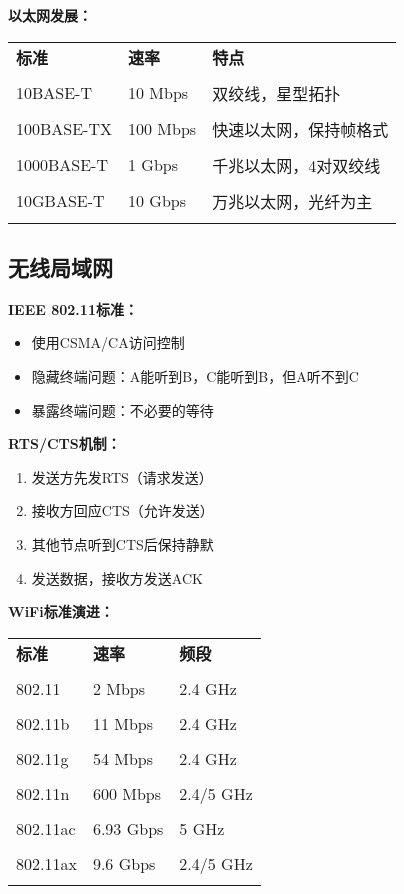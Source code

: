\documentclass[lang=cn,newtx,10pt,scheme=chinese]{../../elegantbook}
\begin{document}
\textbf{以太网发展：}
\begin{longtable}{@{}p{3cm}p{4cm}p{6cm}@{}}
\toprule
\textbf{标准} & \textbf{速率} & \textbf{特点} \\\\ \midrule
\endhead

10BASE-T & 10 Mbps & 双绞线，星型拓扑 \\\\
100BASE-TX & 100 Mbps & 快速以太网，保持帧格式 \\\\
1000BASE-T & 1 Gbps & 千兆以太网，4对双绞线 \\\\
10GBASE-T & 10 Gbps & 万兆以太网，光纤为主 \\\\

\bottomrule
\end{longtable}

\subsection{无线局域网}

\textbf{IEEE 802.11标准：}
\begin{itemize}
  \item 使用CSMA/CA访问控制
  \item 隐藏终端问题：A能听到B，C能听到B，但A听不到C
  \item 暴露终端问题：不必要的等待
\end{itemize}

\textbf{RTS/CTS机制：}
\begin{enumerate}
  \item 发送方先发RTS（请求发送）
  \item 接收方回应CTS（允许发送）
  \item 其他节点听到CTS后保持静默
  \item 发送数据，接收方发送ACK
\end{enumerate}

\textbf{WiFi标准演进：}
\begin{longtable}{@{}p{2.5cm}p{4cm}p{6cm}@{}}
\toprule
\textbf{标准} & \textbf{速率} & \textbf{频段} \\\\ \midrule
\endhead

802.11 & 2 Mbps & 2.4 GHz \\\\
802.11b & 11 Mbps & 2.4 GHz \\\\
802.11g & 54 Mbps & 2.4 GHz \\\\
802.11n & 600 Mbps & 2.4/5 GHz \\\\
802.11ac & 6.93 Gbps & 5 GHz \\\\
802.11ax & 9.6 Gbps & 2.4/5 GHz \\\\

\bottomrule
\end{longtable}
\end{document}
